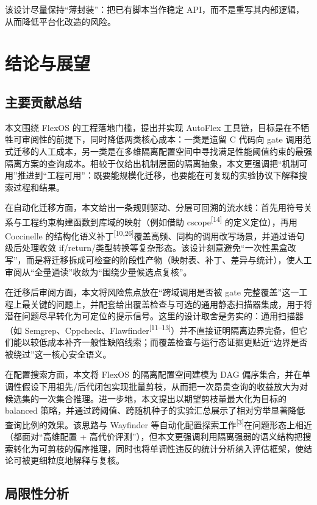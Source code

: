 \documentclass[UTF8,a4paper,12pt,twoside]{ctexart}  %
\begin{document}
该设计尽量保持``薄封装''：把已有脚本当作稳定
API，而不是重写其内部逻辑，从而降低平台化改造的风险。

\newpage
\section{结论与展望}

\subsection{主要贡献总结}

本文围绕 FlexOS 的工程落地门槛，提出并实现 AutoFlex 工具链，目标是在不牺牲可审阅性的前提下，同时降低两类核心成本：一类是遗留 C 代码向 gate 调用范式迁移的人工成本，另一类是在多维隔离配置空间中寻找满足性能阈值约束的最强隔离方案的查询成本。相较于仅给出机制层面的隔离抽象，本文更强调把``机制可用''推进到``工程可用''：既要能规模化迁移，也要能在可复现的实验协议下解释搜索过程和结果。

在自动化迁移方面，本文给出一条规则驱动、分层可回溯的流水线：首先用符号关系与工程约束构建函数到库域的映射（例如借助 cscope\textsuperscript{[14]} 的定义定位），再用 Coccinelle 的结构化语义补丁\textsuperscript{[10,26]}覆盖高频、同构的调用改写场景，并通过语句级后处理收敛 if/return/类型转换等复杂形态。该设计刻意避免``一次性黑盒改写''，而是将迁移拆成可检查的阶段性产物（映射表、补丁、差异与统计），使人工审阅从``全量通读''收敛为``围绕少量候选点复核''。

在迁移后审阅方面，本文将风险焦点放在``跨域调用是否被 gate 完整覆盖''这一工程上最关键的问题上，并配套给出覆盖检查与可选的通用静态扫描器集成，用于将潜在问题尽早转化为可定位的提示信号。这里的设计取舍是务实的：通用扫描器（如 Semgrep、Cppcheck、Flawfinder\textsuperscript{[11--13]}）并不直接证明隔离边界完备，但它们能以较低成本补齐一般性缺陷线索；而覆盖检查与运行态证据更贴近``边界是否被绕过''这一核心安全语义。

在配置搜索方面，本文将 FlexOS 的隔离配置空间建模为 DAG 偏序集合，并在单调性假设下用祖先/后代闭包实现批量剪枝，从而把一次昂贵查询的收益放大为对候选集的一次集合推理。进一步地，本文提出以期望剪枝量最大化为目标的 balanced 策略，并通过跨阈值、跨随机种子的实验汇总展示了相对穷举显著降低查询比例的效果。该思路与 Wayfinder 等自动化配置探索工作\textsuperscript{[3]}在问题形态上相近（都面对``高维配置 + 高代价评测''），但本文更强调利用隔离强弱的语义结构把搜索转化为可剪枝的偏序推理，同时也将单调性违反的统计分析纳入评估框架，使结论可被更细粒度地解释与复核。

\subsection{局限性分析}
\end{document}
